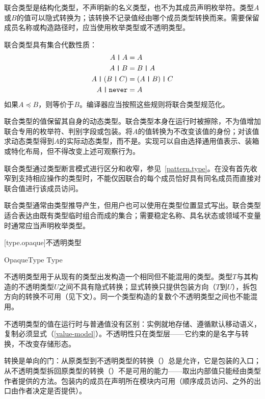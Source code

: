 \pnum
联合类型是结构化类型，不声明新的名义类型，也不为其成员声明枚举符。类型$A$或$B$的值可以隐式转换为；该转换不记录值经由哪个成员类型转换而来。需要保留成员名称或构造路径时，应当使用枚举类型或不透明类型。

\pnum
联合类型具有集合代数性质：
\begin{equation*}
\begin{aligned}
    A \mathbin{\texttt{|}} A &= A \\
    A \mathbin{\texttt{|}} B &= B \mathbin{\texttt{|}} A \\
    A \mathbin{\texttt{|}} (B \mathbin{\texttt{|}} C) &= (A \mathbin{\texttt{|}} B) \mathbin{\texttt{|}} C \\
    A \mathbin{\texttt{|}} \texttt{never} &= A
\end{aligned}
\end{equation*}
如果$A \preceq B$，则等价于$B$。编译器应当按照这些规则将联合类型规范化。

\pnum
联合类型的值保留其自身的动态类型。联合类型本身在运行时被擦除，不为值增加联合专用的枚举符、判别字段或包装。将$A$的值转换为不改变该值的身份；对该值求动态类型得到$A$的实际动态类型，而不是。实现可以自由选择通用值表示、装箱或特化布局，但不得改变上述可观察行为。

\pnum
联合类型通过类型断言模式进行区分和收窄，参见~\ref{pattern.type}。在没有首先收窄到支持相应操作的类型时，不能仅因联合的每个成员恰好具有同名成员而直接对联合值进行该成员访问。

\enternote 联合类型通常由类型推导产生，但用户也可以使用\tcode{|}在类型位置显式写出。联合类型适合表达由既有类型临时组合而成的集合；需要稳定名称、具名状态或领域不变量时通常应当声明枚举类型。\exitnote

[type.opaque]{不透明类型}

\begin{bnf}{OpaqueType}
     Type
\end{bnf}

\pnum
不透明类型用于从现有的类型出发构造一个相同但不能混用的类型。类型$T$与其构造的不透明类型$U$之间不具有隐式转换；显式转换只提供包装方向（$T$到$U$），拆包方向的转换不可用（见下文）。同一个类型构造的复数个不透明类型之间也不能混用。

\pnum
不透明类型的值在运行时与普通值没有区别：实例就地存储、遵循默认移动语义，复制必须显式（\ref{value-model}）。不透明性只在类型层——它约束的是名字与转换，不改变存储形态。

\pnum
{}转换是单向的门：从原类型到不透明类型的转换（）总是允许，它是包装的入口；从不透明类型拆回原类型的转换（）不是可用的能力——取出内部值只能经由类型作者提供的方法。包装内的成员在声明所在模块内可用（顺序成员访问、之外的出口由作者决定是否提供）。

